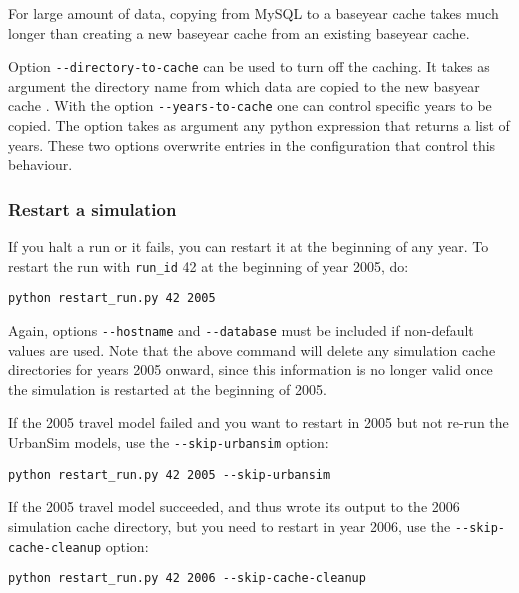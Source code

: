 For large amount of data, copying from MySQL to a baseyear cache takes much
longer than creating a new baseyear cache from an existing baseyear cache.  

Option \verb|--directory-to-cache| 
can be used to turn off the caching. It takes as argument the directory name
from which data are copied to the new basyear cache \baseyearcacheindex. With
the option \verb|--years-to-cache| one can control specific years to be
copied. The option takes as argument any python \pythonindex expression that returns a list
of years. These two options overwrite entries in the configuration that control
this behaviour.

\subsubsection{Restart a simulation}
If you halt a run or it fails, you can restart it at the beginning of any year.
To restart the run with \verb|run_id| 42 at the beginning of year 2005, do:
\pythonindex
\begin{verbatim}
python restart_run.py 42 2005
\end{verbatim}
Again, options \verb|--hostname| and \verb|--database| must be included
if non-default values are used.  Note that the above command will delete any
simulation cache \simulationcacheindex directories for years 2005 onward, since
this information is no longer valid once the simulation is restarted at the
beginning of 2005.

If the 2005 travel model failed and you want to restart in 2005 but not re-run
the UrbanSim models, \modelsindex use the \verb|--skip-urbansim| option:
\pythonindex
\begin{verbatim}
python restart_run.py 42 2005 --skip-urbansim
\end{verbatim}

If the 2005 travel model succeeded, and thus wrote its output to the 2006
simulation cache \simulationcacheindex directory, but you need to restart in year 2006, use the
\verb|--skip-cache-cleanup| option:
\pythonindex
\begin{verbatim}
python restart_run.py 42 2006 --skip-cache-cleanup
\end{verbatim}

